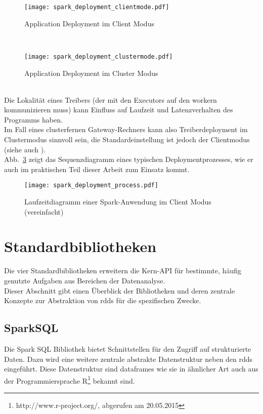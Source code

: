 \begin{figure}[ht!]
	\centering
  \texttt{[image: spark\_deployment\_clientmode.pdf]}
	\caption{Application Deployment im Client Modus}
	\label{fig:spark_deployment_clientmode}
\end{figure}\\

\begin{figure}[ht!]
	\centering
  \texttt{[image: spark\_deployment\_clustermode.pdf]}
	\caption{Application Deployment im Cluster Modus}
	\label{fig:spark_deployment_clustermode}
\end{figure}\\

Die Lokalität eines Treibers (der mit den Executors auf den \gls{worker}n kommunizieren muss) kann Einfluss auf Laufzeit und Latenzverhalten des Programms haben.\\

Im Fall eines clusterfernen Gateway-Rechners kann also Treiberdeployment im Clustermodus sinnvoll sein, die Standardeinstellung ist jedoch der Clientmodus (siehe auch \cite{spark_submission}).\\

Abb.~\ref{fig:app_deployment_process} zeigt das Sequenzdiagramm eines typischen Deploymentprozesses, wie er auch im praktischen Teil dieser Arbeit zum Einsatz kommt.

\begin{figure}[ht!]
	\centering
  \texttt{[image: spark\_deployment\_process.pdf]}
	\caption{Laufzeitdiagramm einer Spark-Anwendung im Client Modus (vereinfacht)}
	\label{fig:app_deployment_process}
\end{figure}

\section{Standardbibliotheken}
Die vier Standardbibliotheken erweitern die Kern-API für bestimmte, häufig genutzte Aufgaben aus Bereichen der Datenanalyse.\\

Dieser Abschnitt gibt einen Überblick der Bibliotheken und deren zentrale Konzepte zur Abstraktion von \glspl{rdd} für die spezifischen Zwecke.\\

\subsection{SparkSQL}
Die Spark SQL Bibliothek bietet Schnittstellen für den Zugriff auf strukturierte Daten. Dazu wird eine weitere zentrale abstrakte Datenstruktur neben den \glspl{rdd} eingeführt. Diese Datenstruktur sind \glspl{dataframe} wie sie in ähnlicher Art auch aus der Programmiersprache R\footnote{http://www.r-project.org/, abgerufen am 20.05.2015} bekannt sind.\\

